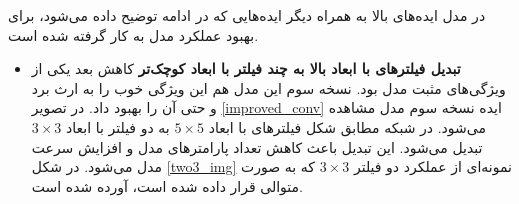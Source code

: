\documentclass[12pt, a4paper]{article}
\begin{document}
در مدل  ایده‌های بالا به همراه دیگر ایده‌هایی که در ادامه توضیح داده می‌شود،
برای بهبود عملکرد مدل به کار گرفته شده است.

\begin{itemize}
    \item \textbf{تبدیل فیلتر‌های با ابعاد بالا به چند فیلتر با ابعاد کوچک‌تر} کاهش بعد یکی از ویژگی‌های مثبت
    مدل  بود. نسخه سوم این مدل هم این ویژگی خوب را به ارث برد و حتی آن را
    بهبود داد. در تصویر \ref{improved_conv} ایده نسخه سوم مدل مشاهده می‌شود. در شبکه 
    مطابق شکل فیلتر‌های با ابعاد $5 \times 5$ به دو فیلتر با ابعاد $3 \times 3$ تبدیل می‌شود. این تبدیل باعث کاهش
    تعداد پارامتر‌های مدل و افزایش سرعت مدل می‌شود. در شکل \ref{two3_img} نمونه‌ای از عملکرد دو فیلتر $3 \times 3$
    که به صورت متوالی قرار داده شده است، آورده شده است.


\end{itemize}
\end{document}
